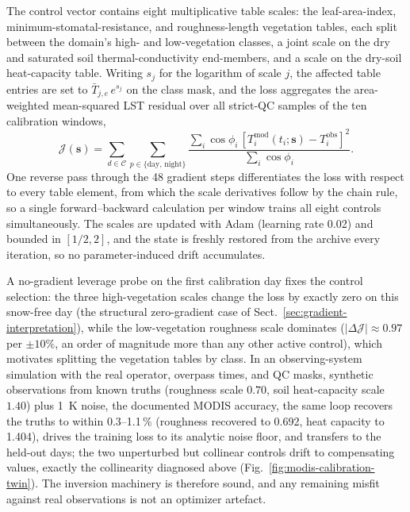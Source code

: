 The control vector contains eight multiplicative table scales: the
leaf-area-index, minimum-stomatal-resistance, and roughness-length vegetation
tables, each split between the domain's high- and low-vegetation classes, a
joint scale on the dry and saturated soil thermal-conductivity end-members,
and a scale on the dry-soil heat-capacity table. Writing $s_j$ for the
logarithm of scale $j$, the affected table entries are set to
$\bar{T}_{j,e}\,e^{s_j}$ on the class mask, and the loss aggregates the
area-weighted mean-squared LST residual over all strict-QC samples of the ten
calibration windows,
\begin{equation}
  \mathcal{J}(\boldsymbol{s}) = \sum_{d\in\mathcal{C}}
    \sum_{p\in\{\mathrm{day},\,\mathrm{night}\}}
    \frac{\sum_i \cos\phi_i\,
      \left[T^{\mathrm{mod}}_i(t_i;\boldsymbol{s})-T^{\mathrm{obs}}_i\right]^2}
         {\sum_i \cos\phi_i}.
\label{eq:calib-loss}
\end{equation}
One reverse pass through the 48 gradient steps differentiates the loss with
respect to every table element, from which the scale derivatives follow by
the chain rule, so a single forward--backward calculation per window trains
all eight controls simultaneously. The scales are updated with Adam
(learning rate 0.02) and bounded in $[1/2,2]$, and the state is freshly
restored from the archive every iteration, so no parameter-induced drift
accumulates.

A no-gradient leverage probe on the first calibration day fixes the control
selection: the three high-vegetation scales change the loss by exactly zero
on this snow-free day (the structural zero-gradient case of
Sect.~\ref{sec:gradient-interpretation}), while the low-vegetation roughness
scale dominates ($|\Delta\mathcal{J}|\approx0.97$ per $\pm10\%$, an order of
magnitude more than any other active control), which motivates splitting the
vegetation tables by class. In an observing-system simulation with the real
operator, overpass times, and QC masks, synthetic observations from known
truths (roughness scale $0.70$, soil heat-capacity scale $1.40$) plus 1~K
noise, the documented MODIS accuracy, the same loop
recovers the truths to within 0.3--1.1\,\% (roughness recovered to 0.692,
heat capacity to 1.404), drives the training loss to its
analytic noise floor, and transfers to the held-out days; the two
unperturbed but collinear controls drift to compensating values, exactly the
collinearity diagnosed above (Fig.~\ref{fig:modis-calibration-twin}). The
inversion machinery is therefore sound, and any remaining misfit against
real observations is not an optimizer artefact.

